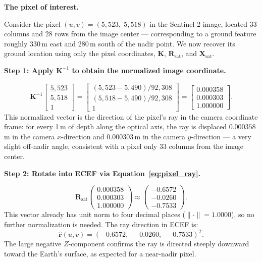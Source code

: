 \documentclass{book}
\begin{document}
\medskip
\noindent\textbf{The pixel of interest.}

Consider the pixel $(u, v) = (5{,}523,\; 5{,}518)$ in the Sentinel-2
image, located 33 columns and 28 rows from the image center ---
corresponding to a ground feature roughly 330\,m east and 280\,m
south of the nadir point.  We now recover its ground location using
only the pixel coordinates, $\mathbf{K}$, $\mathbf{R}_{\text{sat}}$,
and $\mathbf{X}_{\text{sat}}$.

\medskip
\noindent\textbf{Step 1: Apply $\mathbf{K}^{-1}$ to obtain the
normalized image coordinate.}

\[
  \mathbf{K}^{-1}
  \begin{bmatrix} 5{,}523 \\ 5{,}518 \\ 1 \end{bmatrix}
  =
  \begin{bmatrix}
    (5{,}523 - 5{,}490)/92{,}308 \\
    (5{,}518 - 5{,}490)/92{,}308 \\
    1
  \end{bmatrix}
  =
  \begin{bmatrix}
    0.000358 \\ 0.000303 \\ 1.000000
  \end{bmatrix}.
\]
This normalized vector is the direction of the pixel's ray in the
camera coordinate frame: for every 1\,m of depth along the optical
axis, the ray is displaced $0.000358$\,m in the camera $x$-direction
and $0.000303$\,m in the camera $y$-direction --- a very slight off-nadir
angle, consistent with a pixel only 33 columns from the image center.

\medskip
\noindent\textbf{Step 2: Rotate into ECEF via Equation~\eqref{eq:pixel_ray}.}

\[
  \mathbf{R}_{\text{sat}}
  \begin{pmatrix} 0.000358 \\ 0.000303 \\ 1.000000 \end{pmatrix}
  \approx
  \begin{pmatrix} -0.6572 \\ -0.0260 \\ -0.7533 \end{pmatrix}.
\]
This vector already has unit norm to four decimal places
($\|\cdot\| = 1.0000$), so no further normalization is needed.
The ray direction in ECEF is:
\[
  \hat{\mathbf{r}}(u,v)
  = (-0.6572,\; -0.0260,\; -0.7533)^T.
\]
The large negative $Z$-component confirms the ray is directed steeply
downward toward the Earth's surface, as expected for a near-nadir
pixel.
\end{document}
